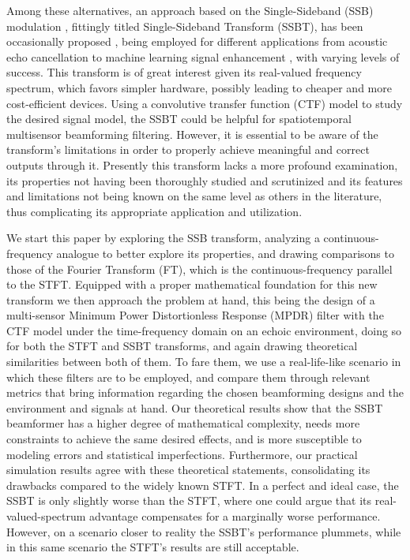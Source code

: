 Among these alternatives, an approach based on the Single-Sideband (SSB) modulation \cite{chen_hybrid_2021,xing_single_2017}, fittingly titled Single-Sideband Transform (SSBT), has been occasionally proposed \cite{crochiere_multirate_1983,oyzerman_system_2012}, being employed for different applications from acoustic echo cancellation \cite{chin_subband_2001} to machine learning signal enhancement \cite{okamoto_subband_2017}, with varying levels of success. This transform is of great interest given its real-valued frequency spectrum, which favors simpler hardware, possibly leading to cheaper and more cost-efficient devices. Using a convolutive transfer function (CTF) model \cite{talmon_relative_2009} to study the desired signal model, the SSBT could be helpful for spatiotemporal multisensor beamforming filtering. However, it is essential to be aware of the transform's limitations in order to properly achieve meaningful and correct outputs through it. Presently this transform lacks a more profound examination, its properties not having been thoroughly studied and scrutinized and its features and limitations not being known on the same level as others in the literature, thus complicating its appropriate application and utilization.

We start this paper by exploring the SSB transform, analyzing a continuous-frequency analogue to better explore its properties, and drawing comparisons to those of the Fourier Transform (FT), which is the continuous-frequency parallel to the STFT. Equipped with a proper mathematical foundation for this new transform we then approach the problem at hand, this being the design of a multi-sensor Minimum Power Distortionless Response (MPDR) filter with the CTF model under the time-frequency domain on an echoic environment, doing so for both the STFT and SSBT transforms, and again drawing theoretical similarities between both of them. To fare them, we use a real-life-like scenario in which these filters are to be employed, and compare them through relevant metrics that bring information regarding the chosen beamforming designs and the environment and signals at hand. Our theoretical results show that the SSBT beamformer has a higher degree of mathematical complexity, needs more constraints to achieve the same desired effects, and is more susceptible to modeling errors and statistical imperfections. Furthermore, our practical simulation results agree with these theoretical statements, consolidating its drawbacks compared to the widely known STFT. In a perfect and ideal case, the SSBT is only slightly worse than the STFT, where one could argue that its real-valued-spectrum advantage compensates for a marginally worse performance. However, on a scenario closer to reality the SSBT's performance plummets, while in this same scenario the STFT's results are still acceptable.

